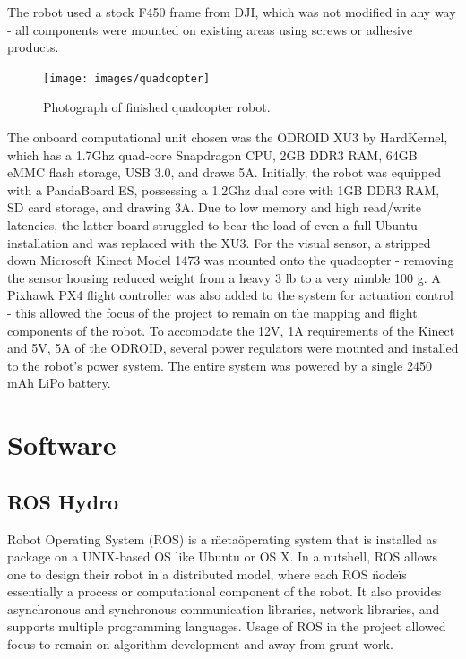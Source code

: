 \documentclass[letterpaper, oneside, 10pt]{report}
\begin{document}
\noindent The robot used a stock F450 frame from DJI, which was not modified in any way - all components were mounted on existing areas using screws or adhesive products.

\begin{figure}[h!]
 \caption{Photograph of finished quadcopter robot.}
 \centering
   \texttt{[image: images/quadcopter]}
\end{figure}

\noindent The onboard computational unit chosen was the ODROID XU3 by HardKernel, which has a 1.7Ghz quad-core Snapdragon CPU, 2GB DDR3 RAM, 64GB eMMC flash storage, USB 3.0, and draws 5A. Initially, the robot was equipped with a PandaBoard ES, possessing a 1.2Ghz dual core with 1GB DDR3 RAM, SD card storage, and drawing 3A. Due to low memory and high read/write latencies, the latter board struggled to bear the load of even a full Ubuntu installation and was replaced with the XU3. For the visual sensor, a stripped down Microsoft Kinect Model 1473 was mounted onto the quadcopter - removing the sensor housing reduced weight from a heavy 3 lb to a very nimble 100 g. A Pixhawk PX4 flight controller was also added to the system for actuation control - this allowed the focus of the project to remain on the mapping and flight components of the robot. To accomodate the 12V, 1A requirements of the Kinect and 5V, 5A of the ODROID, several power regulators were mounted and installed to the robot's power system. The entire system was powered by a single 2450 mAh LiPo battery.

\section{Software}

\subsection{ROS Hydro}

Robot Operating System (ROS) is a \"meta\" operating system that is installed as package on a UNIX-based OS like Ubuntu or OS X. In a nutshell, ROS allows one to design their robot in a distributed model, where each ROS \"node\" is essentially a process or computational component of the robot. It also provides asynchronous and synchronous communication libraries, network libraries, and supports multiple programming languages. Usage of ROS in the project allowed focus to remain on algorithm development and away from grunt work.
\end{document}
